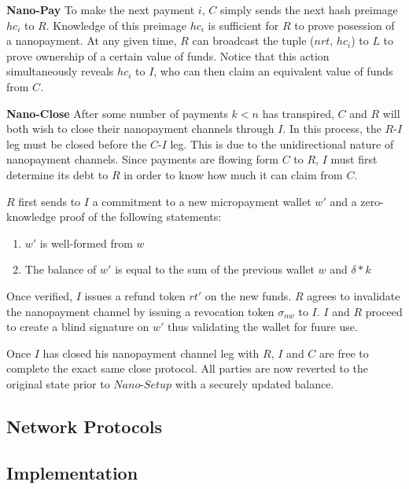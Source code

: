 \textbf{Nano-Pay} To make the next payment $i$, $C$ simply sends the next hash preimage $hc_i$ to
$R$. Knowledge of this preimage $hc_i$ is sufficient for $R$ to prove posession
of a nanopayment. At any given time, $R$ can broadcast the tuple ($nrt$, $hc_i$)
to $L$ to prove ownership of a certain value of funds. Notice that this action
simultaneously reveals $hc_i$ to $I$, who can then claim an equivalent value of
funds from $C$.

\textbf{Nano-Close} After some number of payments $k < n$ has transpired, $C$ and $R$ will both wish
to close their nanopayment channels through $I$. In this process, the $R$-$I$ leg
must be closed before the $C$-$I$ leg. This is due to the unidirectional nature
of nanopayment channels. Since payments are flowing form $C$ to $R$, $I$ must
first determine its debt to $R$ in order to know how much it can claim from $C$.

$R$ first sends to $I$ a commitment to a new micropayment wallet $w'$ and a
zero-knowledge proof of the following statements:

\begin{enumerate}
\item $w'$ is well-formed from $w$
\item The balance of $w'$ is equal to the sum of the previous wallet $w$ and
  $\delta * k$
\end{enumerate}

Once verified, $I$ issues a refund token $rt'$ on the new funds. $R$ agrees to
invalidate the nanopayment channel by issuing a revocation token $\sigma_{nw}$
to $I$. $I$ and $R$ proceed to create a blind signature on $w'$ thus validating
the wallet for fuure use.

Once $I$ has closed his nanopayment channel leg with $R$, $I$ and $C$ are free
to complete the exact same close protocol. All parties are now reverted to the
original state prior to $Nano$-$Setup$ with a securely updated balance.

\subsection{Network Protocols}

\subsection{Implementation}
